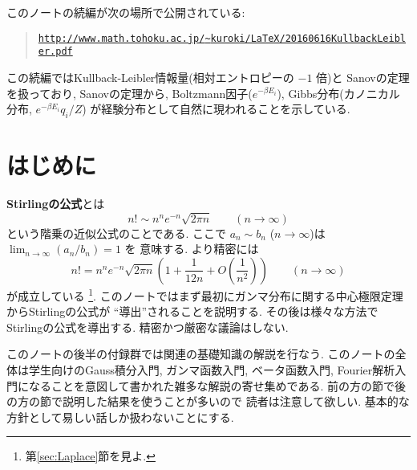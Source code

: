 \documentclass[12pt,twoside]{jarticle}
\theoremstyle{jplain}
\theoremstyle{jplain}
\theoremstyle{jplain}
\numberwithin{theorem}{section}
\numberwithin{equation}{section}
\numberwithin{figure}{section}
\numberwithin{table}{section}
\newcommand\secref[1]{第\ref{#1}節}
\begin{document}
\title{\TITLE}
\author{\AUTHOR}
\date{\DATE}
\maketitle
\tableofcontents

\bigskip\bigskip
{}\enspace
このノートの続編が次の場所で公開されている:
\begin{quote}
{\small
\href{http://www.math.tohoku.ac.jp/~kuroki/LaTeX/20160616KullbackLeibler.pdf}
{\tt http://www.math.tohoku.ac.jp/{\textasciitilde}kuroki/LaTeX/20160616KullbackLeibler.pdf}
}
\end{quote}
この続編ではKullback-Leibler情報量(相対エントロピーの $-1$ 倍)と
Sanovの定理を扱っており, Sanovの定理から, 
Boltzmann因子($e^{-\beta E_i}$), 
Gibbs分布(カノニカル分布, $e^{-\beta E_i}q_i/Z$)
が経験分布として自然に現われることを示している.


\setcounter{section}{-1} %

\section{はじめに}
\label{sec:intro}

{\bf Stirlingの公式}とは
\[
n! \sim n^n e^{-n} \sqrt{2\pi n} \qquad (n\to \infty)
\]
という階乗の近似公式のことである.
ここで $a_n\sim b_n$ ($n\to\infty$)は $\lim_{n\to\infty}(a_n/b_n)=1$ を
意味する. より精密には
\[
n! = n^n e^{-n} \sqrt{2\pi n}\left(1+\frac{1}{12n}+O\left(\frac{1}{n^2}\right)\right) \qquad (n\to \infty)
\]
が成立している%
\footnote{\secref{sec:Laplace}を見よ.}.
このノートではまず最初にガンマ分布に関する中心極限定理からStirlingの公式が
``導出''されることを説明する. 
その後は様々な方法でStirlingの公式を導出する.
精密かつ厳密な議論はしない.

このノートの後半の付録群では関連の基礎知識の解説を行なう.
このノートの全体は学生向けのGauss積分入門, ガンマ函数入門, ベータ函数入門,
Fourier解析入門になることを意図して書かれた雑多な解説の寄せ集めである.
前の方の節で後の方の節で説明した結果を使うことが多いので
読者は注意して欲しい.
基本的な方針として易しい話しか扱わないことにする.
\end{document}
